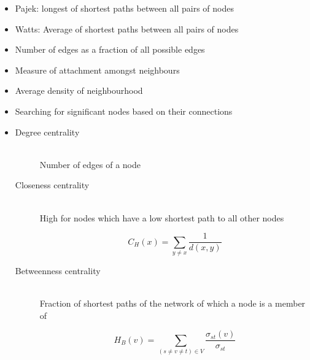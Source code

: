 \documentclass[a4paper]{article}
\begin{document}

\begin{itemize}
  \item
    Pajek: longest of shortest paths between all pairs of nodes

  \item
    Watts: Average of shortest paths between all pairs of nodes
\end{itemize}


\begin{itemize}
  \item
    Number of edges as a fraction of all possible edges
\end{itemize}


\begin{itemize}
  \item
    Measure of attachment amongst neighbours

  \item
    Average density of neighbourhood
\end{itemize}


\begin{itemize}
  \item
    Searching for significant nodes based on their connections

  \item
    \begin{description}
      \item[Degree centrality] \hfill \\
        Number of edges of a node

      \item[Closeness centrality] \hfill \\
        High for nodes which have a low shortest path to all other nodes

        \[
          C_{H}(x) = \sum_{y \neq x} \frac{1}{d(x, y)}
        \]

      \item[Betweenness centrality] \hfill \\
        Fraction of shortest paths of the network of which a node is a member of

        \[
          H_{B}(v) = \sum_{(s \neq v \neq t) \in V} \frac{\sigma_{st}(v)}{\sigma_{st}}
        \]

    \end{description}
\end{itemize}
\end{document}
